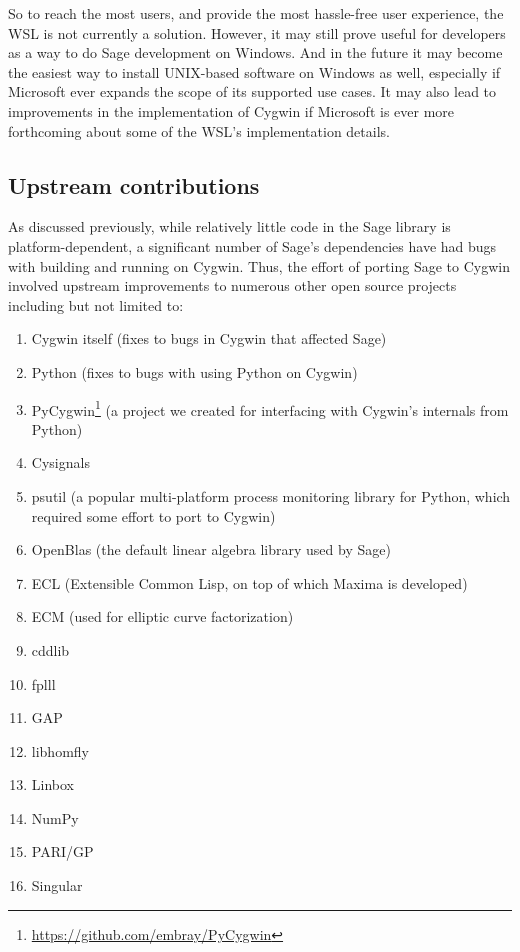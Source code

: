 So to reach the most users, and provide the most hassle-free user experience,
the WSL is not currently a solution.  However, it may still prove useful for
developers as a way to do Sage development on Windows. And in the future it may
become the easiest way to install UNIX-based software on Windows as well,
especially if Microsoft ever expands the scope of its supported use cases. It
may also lead to improvements in the implementation of Cygwin if Microsoft is
ever more forthcoming about some of the WSL's implementation details.


\hypertarget{upstream-contributions}{%
\subsection{Upstream contributions}\label{upstream-contributions}}

As discussed previously, while relatively little code in the Sage library is
platform-dependent, a significant number of Sage's dependencies have had bugs
with building and running on Cygwin.  Thus, the effort of porting Sage to
Cygwin involved upstream improvements to numerous other open source projects
including but not limited to:

\begin{enumerate}
\item Cygwin itself (fixes to bugs in Cygwin that affected Sage)
\item Python (fixes to bugs with using Python on Cygwin)
\item PyCygwin\footnote{\url{https://github.com/embray/PyCygwin}} (a project we created for interfacing with Cygwin's internals from Python)
\item Cysignals
\item psutil (a popular multi-platform process monitoring library for Python, which required some effort to port to Cygwin)
\item OpenBlas (the default linear algebra library used by Sage)
\item ECL (Extensible Common Lisp, on top of which Maxima is developed)
\item ECM (used for elliptic curve factorization)
\item cddlib
\item fplll
\item GAP
\item libhomfly
\item Linbox
\item NumPy
\item PARI/GP
\item Singular
\end{enumerate}

